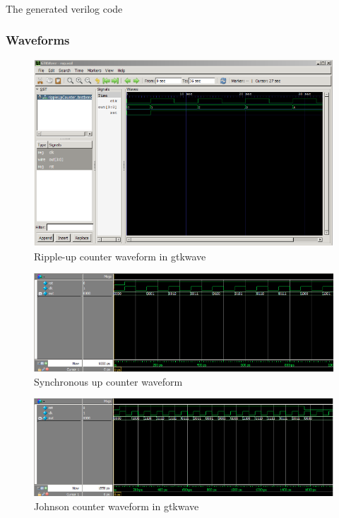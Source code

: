 \documentclass{article}
\begin{document}
	\paragraph{} The generated verilog code
	

	\subsubsection{Waveforms}
	\begin{figure}[H]
	  \centering
	  \includegraphics[width=0.75\linewidth]{figures/waveforms/rippleUp_wave.png}
	  \caption{Ripple-up counter waveform in gtkwave}
	  \label{fig:rippleUp_waveform}
	\end{figure}

	\begin{figure}[H]
	  \centering
	  \includegraphics[width=0.75\linewidth]{figures/waveforms/synUp_wave.png}
	  \caption{Synchronous up counter waveform}
	  \label{fig:synUp_waveform}
	\end{figure}

	\begin{figure}[H]
	  \centering
	  \includegraphics[width=0.75\linewidth]{figures/waveforms/johnson_wave.png}
	  \caption{Johnson counter waveform in gtkwave}
	  \label{fig:johnson_waveform}
	\end{figure}
\end{document}
